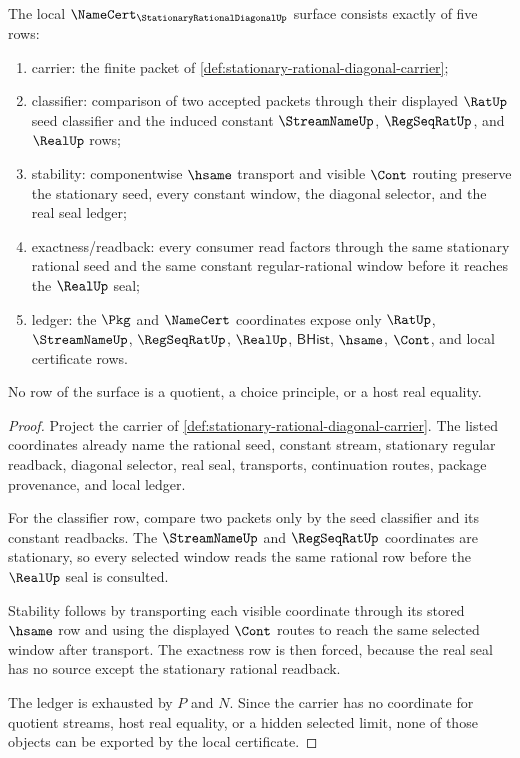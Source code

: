 \begin{theorem}
\label{thm:stationary-rational-diagonal-namecert-obligation-surface}
The local $\NameCert_{\StationaryRationalDiagonalUp}$ surface consists exactly
of five rows:
\begin{enumerate}
\item carrier: the finite packet of
\autoref{def:stationary-rational-diagonal-carrier};
\item classifier: comparison of two accepted packets through their displayed
$\RatUp$ seed classifier and the induced constant $\StreamNameUp$,
$\RegSeqRatUp$, and $\RealUp$ rows;
\item stability: componentwise $\hsame$ transport and visible $\Cont$ routing
preserve the stationary seed, every constant window, the diagonal selector, and
the real seal ledger;
\item exactness/readback: every consumer read factors through the same
stationary rational seed and the same constant regular-rational window before
it reaches the $\RealUp$ seal;
\item ledger: the $\Pkg$ and $\NameCert$ coordinates expose only $\RatUp$,
$\StreamNameUp$, $\RegSeqRatUp$, $\RealUp$, $\mathsf{BHist}$, $\hsame$,
$\Cont$, and local certificate rows.
\end{enumerate}
No row of the surface is a quotient, a choice principle, or a host real
equality.
\end{theorem}
\begin{proof}
Project the carrier of
\autoref{def:stationary-rational-diagonal-carrier}. The listed coordinates
already name the rational seed, constant stream, stationary regular readback,
diagonal selector, real seal, transports, continuation routes, package
provenance, and local ledger.

For the classifier row, compare two packets only by the seed classifier and its
constant readbacks. The $\StreamNameUp$ and $\RegSeqRatUp$ coordinates are
stationary, so every selected window reads the same rational row before the
$\RealUp$ seal is consulted.

Stability follows by transporting each visible coordinate through its stored
$\hsame$ row and using the displayed $\Cont$ routes to reach the same selected
window after transport. The exactness row is then forced, because the real seal
has no source except the stationary rational readback.

The ledger is exhausted by $P$ and $N$. Since the carrier has no coordinate for
quotient streams, host real equality, or a hidden selected limit, none of those
objects can be exported by the local certificate.
\end{proof}

